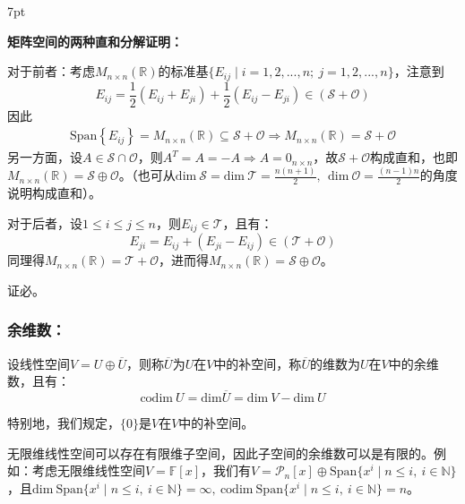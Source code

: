 \documentclass[zihao=-4,UTF8]{report}
\theoremstyle{mystyle} %
\newenvironment{graybox}{%
\def\FrameCommand{%
\hspace{1pt}%
{\color{gray}\small \vrule width 2pt}%
{\color{graybox_color}\vrule width 4pt}%
\colorbox{graybox_color}%
}%
\MakeFramed{\advance\hsize-\width\FrameRestore}%
\noindent\hspace{-4.55pt}%
\begin{adjustwidth}{}{7pt}%
\vspace{2pt}\vspace{2pt}%
}
{%
\vspace{2pt}\end{adjustwidth}\endMakeFramed%
}
\begin{document}
\begin{enumerate}
    \begin{graybox}
        \textbf{矩阵空间的两种直和分解证明：}\par
        对于前者：考虑$M_{n\times n}(\mathbb{R})$的标准基$\{E_{ij}\mid i = 1,2,...,n;\ j = 1,2,...,n\}$，注意到
    \begin{equation*}
        E_{ij} = \frac{1}{2}(E_{ij}+E_{ji}) + \frac{1}{2}(E_{ij}-E_{ji})\in (\mathcal{S}+\mathcal{O})
    \end{equation*}
    因此
    \begin{align*}
        \text{Span} \left\{E_{ij}\right\} =  M_{n\times n}(\mathbb{R}) \subseteq \mathcal{S}+\mathcal{O}
        \Longrightarrow 
        M_{n\times n}(\mathbb{R}) =\mathcal{S}+ \mathcal{O} 
    \end{align*}
    另一方面，设$A \in \mathcal{S}\cap \mathcal{O}$，则$A^{T} = A =-A \Longrightarrow A = 0_{n\times n}$，故$\mathcal{S}+ \mathcal{O}$构成直和，也即$M_{n\times n}(\mathbb{R}) =\mathcal{S}\oplus  \mathcal{O}$。（也可从$ \text{dim}\ \mathcal{S} = \text{dim}\ \mathcal{T} = \frac{n(n+1)}{2},\ \ \text{dim}\ \mathcal{O} = \frac{(n-1)n}{2}$的角度说明构成直和）。\par
    对于后者，设$1 \le i \le j \le n$，则$E_{ij}\in \mathcal{T}$，且有：
    \begin{equation*}
        E_{ji} = E_{ij} + (E_{ji} - E_{ij}) \in (\mathcal{T} + \mathcal{O})
    \end{equation*}
    同理得$M_{n\times n}(\mathbb{R}) =\mathcal{T}+ \mathcal{O}$，进而得$M_{n\times n}(\mathbb{R}) =\mathcal{S}\oplus \mathcal{O}$。\par
    证必。
    \end{graybox}
\end{enumerate}

\subsubsection{余维数：}
    设线性空间$V = U \oplus \overline{U}$，则称$\overline{U}$为$U$在$V$中的补空间，称$\overline{U}$的维数为$U$在$V$中的余维数，且有：
    \begin{equation*}
        \text{codim}\ U = \text{dim}\overline{U} =  \text{dim}\ V - \text{dim}\  U
    \end{equation*}\par
    特别地，我们规定，$\{0\}$是$V$在$V$中的补空间。\par
    {\color{gray}\small 无限维线性空间可以存在有限维子空间，因此子空间的余维数可以是有限的。例如：考虑无限维线性空间$V = \mathbb{F}[x]$，我们有$V = \mathcal{P}_n[x]\oplus \text{Span}\{x^i\mid n\le i ,\ i \in \mathbb{N}\} $，且$\text{dim}\ \text{Span}\{x^i\mid n\le i ,\ i \in \mathbb{N}\} = \infty,\ \text{codim}\ \text{Span}\{x^i\mid n\le i ,\ i \in \mathbb{N}\} = n$。}
\end{document}
